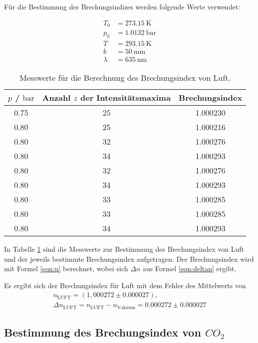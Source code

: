 Für die Bestimmung der Brechungsindizes werden folgende Werte verwendet:

\begin{align}
	T_0 &= \SI{273,15}{\kelvin} \\
	p_0 &= \SI{1,0132}{\bar}  \\
	T &= \SI{293,15}{\kelvin} \\
	b &= \SI{50}{\milli\meter} \\
	\lambda &= \SI{635}{\nano\meter}
\end{align}



\begin{table}
	\caption{Messwerte für die Berechnung des Brechungsindex von Luft.}
	\label{tab:luftbrech}
	\centering
	\begin{tabular}{ccc}
	\toprule
	$p$ / $\si{\bar}$ & Anzahl $z$ der Intensitätsmaxima & Brechungsindex \\
	\midrule
		0.75 & 25 & 1.000230 \\
		0.80 & 25 & 1.000216 \\
		0.80 & 32 & 1.000276 \\
		0.80 & 34 & 1.000293 \\
		0.80 & 32 & 1.000276 \\
		0.80 & 34 & 1.000293 \\
		0.80 & 33 & 1.000285 \\
		0.80 & 33 & 1.000285 \\
		0.80 & 34 & 1.000293 \\
	\bottomrule
	\end{tabular}
\end{table}

In Tabelle \ref{tab:luftbrech} sind die Messwerte zur Bestimmung des Brechungsindex von Luft
und der jeweils bestimmte Brechungsindex aufgetragen.
Der Brechungsindex wird mit Formel \eqref{eqn:n} berechnet, wobei sich $\Delta n$ aus Formel
\eqref{eqn:deltan} ergibt.

Es ergibt sich der Brechungsindex für Luft mit dem Fehler des Mittelwerts von
\begin{gather}
	n_{\mathrm{LUFT}} = (1,000272 \pm 0.000027) \mathrm{,}\\
  \Delta n_{\mathrm{LUFT}}=n_{\mathrm{LUFT}}-n_{\mathrm{Vakuum}}=0.000272\pm0.000027
\end{gather}

\subsection{Bestimmung des Brechungsindex von \texorpdfstring{$CO_2$}{math} }

